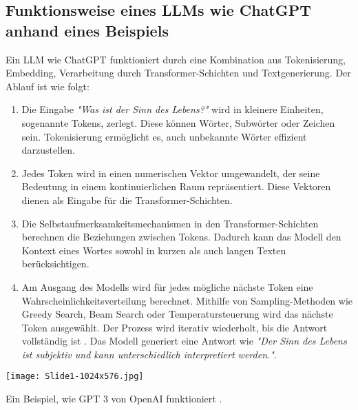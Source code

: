 \documentclass[12pt]{article}
\begin{document}
\subsection{Funktionsweise eines LLMs wie ChatGPT anhand eines Beispiels}

Ein LLM wie ChatGPT funktioniert durch eine Kombination aus Tokenisierung, Embedding, Verarbeitung durch Transformer-Schichten und Textgenerierung. Der Ablauf ist wie folgt:

\begin{enumerate}
    \item Die Eingabe \emph{"Was ist der Sinn des Lebens?"} wird in kleinere Einheiten, sogenannte Tokens, zerlegt. Diese können Wörter, Subwörter oder Zeichen sein. Tokenisierung ermöglicht es, auch unbekannte Wörter effizient darzustellen.\\
    \item Jedes Token wird in einen numerischen Vektor umgewandelt, der seine Bedeutung in einem kontinuierlichen Raum repräsentiert. Diese Vektoren dienen als Eingabe für die Transformer-Schichten.\\
    \item Die Selbstaufmerksamkeitsmechanismen in den Transformer-Schichten berechnen die Beziehungen zwischen Tokens. Dadurch kann das Modell den Kontext eines Wortes sowohl in kurzen als auch langen Texten berücksichtigen.\\
    \item Am Ausgang des Modells wird für jedes mögliche nächste Token eine Wahrscheinlichkeitsverteilung berechnet. Mithilfe von Sampling-Methoden wie Greedy Search, Beam Search oder Temperatursteuerung wird das nächste Token ausgewählt. Der Prozess wird iterativ wiederholt, bis die Antwort vollständig ist \cite{brown2020}. Das Modell generiert eine Antwort wie \emph{"Der Sinn des Lebens ist subjektiv und kann unterschiedlich interpretiert werden."}.\\
\end{enumerate}

\begin{center}
    \texttt{[image: Slide1-1024x576.jpg]}
\end{center}

\begin{center}
Ein Beispiel, wie GPT 3 von OpenAI funktioniert \cite{gpt3}. 
\end{center}
\end{document}
